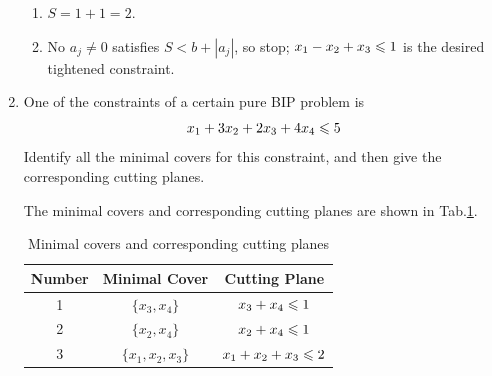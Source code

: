 \documentclass[a4paper]{article}
\begin{document}
\begin{enumerate}
\begin{solution}
	\begin{enumerate}
		\item $S=1+1=2$.
		\item No $a_j\neq 0$ satisfies $S<b+|a_j|$, so stop; $x_1-x_2+x_3\leqslant 1$ is the desired tightened constraint.
	\end{enumerate}
	
\end{solution}

\item One of the constraints of a certain pure BIP problem is $$x_1+3x_2+2x_3+4x_4\leqslant 5$$
Identify all the minimal covers for this constraint, and then give the corresponding cutting planes.

\begin{solution}
	The minimal covers and corresponding cutting planes are shown in Tab.\ref{tabminimal}.
	\begin{table}[H]
		\centering
		\caption{Minimal covers and corresponding cutting planes}
		\label{tabminimal}
		\begin{tabular}{ccc}
			\toprule[1.5pt]			
			Number&Minimal Cover&Cutting Plane\\
			\midrule
			1&$\{x_3,x_4\}$              &$x_3+x_4\leqslant 1$\\
			2&$\{x_2,x_4\}$              &$x_2+x_4\leqslant 1$\\
			3&$\{x_1,x_2,x_3\}$              &$x_1+x_2+x_3\leqslant 2$\\
			\bottomrule[1.5pt]
		\end{tabular}
	\end{table}
	
\end{solution}

\end{enumerate}
%  

%  
  
\end{document}
